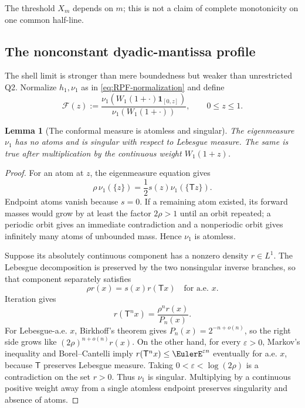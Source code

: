 \documentclass[11pt,oneside]{article}
\newtheorem{lemma}[theorem]{Lemma}
\theoremstyle{definition}
\theoremstyle{remark}
\newcommand{\T}{\mathsf T}
\begin{document}
The threshold $X_m$ depends on $m$; this is not a claim of complete
monotonicity on one common half-line.

\subsection{The nonconstant dyadic-mantissa profile}

The shell limit is stronger than mere boundedness but weaker than unrestricted
Q2.  Normalize $h_1,\nu_1$ as in \eqref{eq:RPF-normalization} and define
\begin{equation}
 \mathscr F(z):=
 \frac{\nu_1(W_1(1+\cdot)\mathbf1_{[0,z]})}
      {\nu_1(W_1(1+\cdot))},
 \qquad 0\le z\le1.
 \label{eq:F-profile}
\end{equation}

\begin{lemma}[The conformal measure is atomless and singular]
\label{lem:singular}
The eigenmeasure $\nu_1$ has no atoms and is singular with respect to Lebesgue
measure.  The same is true after multiplication by the continuous weight
$W_1(1+z)$.
\end{lemma}

\begin{proof}
For an atom at $z$, the eigenmeasure equation gives
\begin{equation}
 \rho\,\nu_1(\{z\})
 =\frac12s(z)\nu_1(\{\T z\}).
 \label{eq:atom-relation}
\end{equation}
Endpoint atoms vanish because $s=0$.  If a remaining atom existed, its forward
masses would grow by at least the factor $2\rho>1$ until an orbit repeated; a
periodic orbit gives an immediate contradiction and a nonperiodic orbit gives
infinitely many atoms of unbounded mass.  Hence $\nu_1$ is atomless.

Suppose its absolutely continuous component has a nonzero density $r\in L^1$.
The Lebesgue decomposition is preserved by the two nonsingular inverse
branches, so that component separately satisfies
\begin{equation}
 \rho r(x)=s(x)r(\T x)
 \quad\text{for a.e. }x.
 \label{eq:conformal-density}
\end{equation}
Iteration gives
\begin{equation}
 r(\T^nx)=\frac{\rho^nr(x)}{P_n(x)}.
 \label{eq:density-iteration}
\end{equation}
For Lebesgue-a.e. $x$, Birkhoff's theorem gives
$P_n(x)=2^{-n+o(n)}$, so the right side grows like
$(2\rho)^{n+o(n)}r(x)$.  On the other hand, for every $\varepsilon>0$,
Markov's inequality and Borel--Cantelli imply
$r(\T^nx)\le\EulerE^{\varepsilon n}$ eventually for a.e. $x$, because $\T$
preserves Lebesgue measure.  Taking
$0<\varepsilon<\log(2\rho)$ is a contradiction on the set $r>0$.  Thus
$\nu_1$ is singular.  Multiplying by a continuous positive weight away from a
single atomless endpoint preserves singularity and absence of atoms.
\end{proof}
\end{document}
